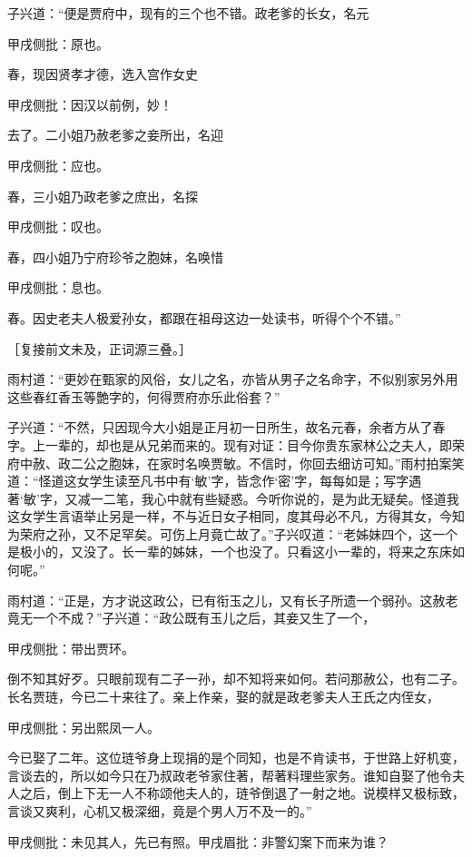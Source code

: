 \begin{parag}
    子兴道：“便是贾府中，现有的三个也不错。政老爹的长女，名元\begin{note}甲戌侧批：原也。\end{note}春，现因贤孝才德，选入宫作女史\begin{note}甲戌侧批：因汉以前例，妙！\end{note}去了。二小姐乃赦老爹之妾所出，名迎\begin{note}甲戌侧批：应也。\end{note}春，三小姐乃政老爹之庶出，名探\begin{note}甲戌侧批：叹也。\end{note}春，四小姐乃宁府珍爷之胞妹，名唤惜\begin{note}甲戌侧批：息也。\end{note}春。因史老夫人极爱孙女，都跟在祖母这边一处读书，听得个个不错。”\begin{note}［复接前文未及，正词源三叠。］\end{note}雨村道：“更妙在甄家的风俗，女儿之名，亦皆从男子之名命字，不似别家另外用这些春红香玉等艶字的，何得贾府亦乐此俗套？”
\end{parag}


\begin{parag}
    子兴道：“不然，只因现今大小姐是正月初一日所生，故名元春，余者方从了春字。上一辈的，却也是从兄弟而来的。现有对证：目今你贵东家林公之夫人，即荣府中赦、政二公之胞妹，在家时名唤贾敏。不信时，你回去细访可知。”雨村拍案笑道：“怪道这女学生读至凡书中有‘敏’字，皆念作‘密’字，每每如是；写字遇著‘敏’字，又减一二笔，我心中就有些疑惑。今听你说的，是为此无疑矣。怪道我这女学生言语举止另是一样，不与近日女子相同，度其母必不凡，方得其女，今知为荣府之孙，又不足罕矣。可伤上月竟亡故了。”子兴叹道：“老姊妹四个，这一个是极小的，又没了。长一辈的姊妹，一个也没了。只看这小一辈的，将来之东床如何呢。”
\end{parag}


\begin{parag}
    雨村道：“正是，方才说这政公，已有衔玉之儿，又有长子所遗一个弱孙。这赦老竟无一个不成？”子兴道：“政公既有玉儿之后，其妾又生了一个，\begin{note}甲戌侧批：带出贾环。\end{note}倒不知其好歹。只眼前现有二子一孙，却不知将来如何。若问那赦公，也有二子。长名贾琏，今已二十来往了。亲上作亲，娶的就是政老爹夫人王氏之内侄女，\begin{note}甲戌侧批：另出熙凤一人。\end{note}今已娶了二年。这位琏爷身上现捐的是个同知，也是不肯读书，于世路上好机变，言谈去的，所以如今只在乃叔政老爷家住著，帮著料理些家务。谁知自娶了他令夫人之后，倒上下无一人不称颂他夫人的，琏爷倒退了一射之地。说模样又极标致，言谈又爽利，心机又极深细，竟是个男人万不及一的。”\begin{note}甲戌侧批：未见其人，先已有照。甲戌眉批：非警幻案下而来为谁？\end{note}
\end{parag}


